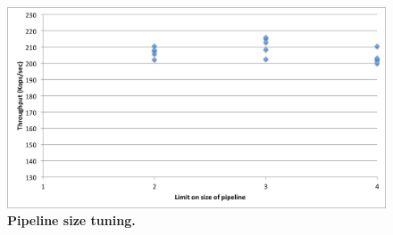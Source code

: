 {\begin{figure}[htb]
\includegraphics[width=\figw]{Figs/pipeline-2.png}
\caption{{\bf Pipeline size tuning.} 
}
\label{fig:pipeline-2}
\end{figure}

}